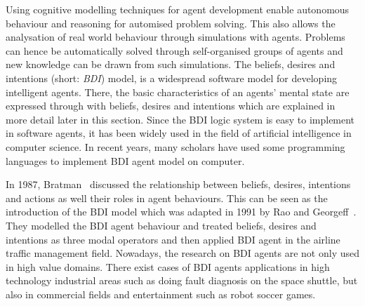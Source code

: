 Using cognitive modelling techniques for agent development enable autonomous behaviour and reasoning for automised problem solving.
This also allows the analysation of real world behaviour through simulations with agents.
Problems can hence be automatically solved through self-organised groups of agents and new knowledge can be drawn from such simulations.
The beliefs, desires and intentions (short: \emph{BDI}) model, is a widespread software model for developing intelligent agents.
There, the basic characteristics of an agents' mental state are expressed through with beliefs, desires and intentions which are explained in more detail later in this section.
Since the BDI logic system is easy to implement in software agents, it has been widely used in the field of artificial intelligence in computer science.
In recent years, many scholars have used some programming languages to implement BDI agent model on computer.

In 1987, Bratman~\cite{MICHAEL_PlansResource_1988} discussed the relationship between beliefs, desires, intentions and actions as well their roles in agent behaviours.
This can be seen as the introduction of the BDI model which was adapted in 1991 by Rao and Georgeff~\cite{rao_modeling_1991}.
They modelled the BDI agent behaviour and treated beliefs, desires and intentions as three modal operators and then applied BDI agent in the airline traffic management field.
Nowadays, the research on BDI agents are not only used in high value domains.
There exist cases of BDI agents applications in high technology industrial areas such as doing fault diagnosis on the space shuttle, but also in commercial fields and entertainment such as robot soccer games.

